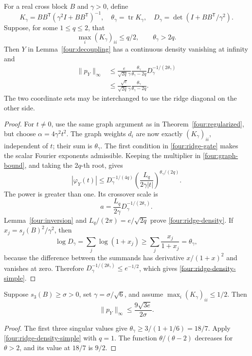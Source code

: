 \begin{theorem}\label{four:ridge}
For a real cross block \(B\) and \(\gamma>0\), define
\[
 K_\gamma=BB^{\mathsf T}(\gamma^2I+BB^{\mathsf T})^{-1},\quad
 \theta_\gamma=\operatorname{tr}K_\gamma,\quad
 D_\gamma=\det(I+BB^{\mathsf T}/\gamma^2).
\]
Suppose, for some \(1\leq q\leq2\), that
\begin{equation}\label{four:ridge-gate}
 \max_i(K_\gamma)_{ii}\leq q/2,\qquad
 \theta_\gamma>2q.
\end{equation}
Then \(Y\) in Lemma~\ref{four:decoupling} has a continuous density
vanishing at infinity and
\begin{align}
 \|p_Y\|_\infty
 &\leq\frac{e}{\sqrt{2q}\,\gamma}
       \frac{\theta_\gamma}{\theta_\gamma-2q}
       D_\gamma^{-1/(2\theta_\gamma)}
 \label{four:ridge-density}\\
 &\leq\frac{\sqrt e}{\sqrt{2q}\,\gamma}
       \frac{\theta_\gamma}{\theta_\gamma-2q}.
 \label{four:ridge-density-simple}
\end{align}
The two coordinate sets may be interchanged to use the ridge
diagonal on the other side.
\end{theorem}
\begin{proof}
For \(t\ne0\), use the same graph argument as in
Theorem~\ref{four:regularized}, but choose
\(\alpha=4\gamma^2t^2\).  The graph weights \(d_i\) are now
exactly \((K_\gamma)_{ii}\), independent of \(t\); their sum
is \(\theta_\gamma\).  The first condition in
\eqref{four:ridge-gate} makes the scalar Fourier exponents
admissible.  Keeping the multiplier in
\eqref{four:graph-bound}, and taking the \(2q\)-th root, gives
\[
 |\varphi_Y(t)|\leq D_\gamma^{-1/(4q)}
           \left(\frac{L_q}{2\gamma|t|}\right)^{\theta_\gamma/(2q)}.
\]
The power is greater than one.  Its crossover scale is
\[
 a=\frac{L_q}{2\gamma}D_\gamma^{-1/(2\theta_\gamma)}.
\]
Lemma~\ref{four:inversion} and
\(L_q/(2\pi)=e/\sqrt{2q}\) prove
\eqref{four:ridge-density}.
If \(x_j=s_j(B)^2/\gamma^2\), then
\[
 \log D_\gamma=\sum_j\log(1+x_j)
 \geq\sum_j\frac{x_j}{1+x_j}=\theta_\gamma,
\]
because the difference between the summands has derivative
\(x/(1+x)^2\) and vanishes at zero.  Therefore
\(D_\gamma^{-1/(2\theta_\gamma)}\leq e^{-1/2}\), which gives
\eqref{four:ridge-density-simple}.
\end{proof}

\begin{corollary}\label{four:ridge-three}
Suppose \(s_3(B)\geq\sigma>0\), set
\(\gamma=\sigma/\sqrt6\), and assume
\(\max_i(K_\gamma)_{ii}\leq1/2\).  Then
\begin{equation}\label{four:ridge-three-bound}
 \|p_Y\|_\infty\leq\frac{9\sqrt{3e}}{2\sigma}.
\end{equation}
\end{corollary}
\begin{proof}
The first three singular values give
\(\theta_\gamma\geq3/(1+1/6)=18/7\).
Apply \eqref{four:ridge-density-simple} with \(q=1\).
The function \(\theta/(\theta-2)\) decreases for \(\theta>2\),
and its value at \(18/7\) is \(9/2\).
\end{proof}

